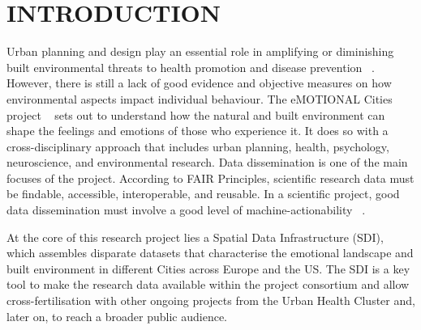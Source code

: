 \documentclass{isprs} %
\begin{document}
\maketitle


\section{INTRODUCTION}\label{INTRODUCTION}

\sloppy

Urban planning and design play an essential role in amplifying or diminishing built environmental threats to health promotion and disease prevention ~\cite{keedwell2017,hackman2019}. However, there is still a lack of good evidence and objective measures on how environmental aspects impact individual behaviour. The eMOTIONAL Cities project ~\cite{emotionalCities2021} sets out to understand how the natural and built environment can shape the feelings and emotions of those who experience it. It does so with a cross-disciplinary approach that includes urban planning, health, psychology, neuroscience, and environmental research.
Data dissemination is one of the main focuses of the project. According to FAIR Principles, scientific research data must be findable, accessible, interoperable, and reusable. In a scientific project, good data dissemination must involve a good level of machine-actionability ~\cite{fair2022}.

At the core of this research project lies a Spatial Data Infrastructure (SDI), which assembles disparate datasets that characterise the emotional landscape and built environment in different Cities across Europe and the US. The SDI is a key tool to make the research data available within the project consortium and allow cross-fertilisation with other ongoing projects from the Urban Health Cluster and, later on, to reach a broader public audience.


\end{document}
